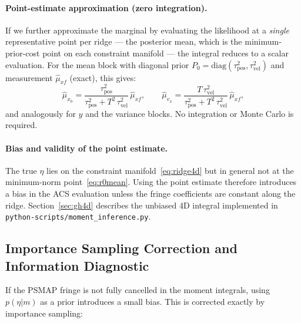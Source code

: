 \documentclass[11pt,a4paper]{article}
\begin{document}
\paragraph{Point-estimate approximation (zero integration).}
If we further approximate the marginal by evaluating the likelihood at a
\emph{single} representative point per ridge — the posterior mean,
which is the minimum-prior-cost point on each constraint manifold — the
integral reduces to a scalar evaluation.  For the mean block with diagonal
prior $P_0 = \mathrm{diag}(\tau_\mathrm{pos}^2, \tau_\mathrm{vel}^2)$
and measurement $\hat\mu_{xf}$ (exact), this gives:
\begin{equation}
  \hat\mu_{x_0} =
    \frac{\tau_\mathrm{pos}^2}{\tau_\mathrm{pos}^2 + T^2\,\tau_\mathrm{vel}^2}
    \,\hat\mu_{xf},
  \qquad
  \hat\mu_{v_x} =
    \frac{T\,\tau_\mathrm{vel}^2}{\tau_\mathrm{pos}^2 + T^2\,\tau_\mathrm{vel}^2}
    \,\hat\mu_{xf},
  \label{eq:r0mean}
\end{equation}
and analogously for $y$ and the variance blocks.  No integration or Monte Carlo
is required.

\paragraph{Bias and validity of the point estimate.}
The true $\eta$ lies on the constraint manifold~\eqref{eq:ridge4d} but in
general not at the minimum-norm point~\eqref{eq:r0mean}.  Using the point
estimate therefore introduces a bias in the ACS evaluation unless the fringe
coefficients are constant along the ridge.  Section~\ref{sec:gh4d} describes
the unbiased 4D integral implemented in \texttt{python-scripts/moment\_inference.py}.

\subsection{Importance Sampling Correction and Information Diagnostic}
\label{sec:is}

If the PSMAP fringe is not fully cancelled in the moment integrals, using
$p(\eta|m)$ as a prior introduces a small bias.  This is corrected exactly
by importance sampling:
\end{document}
